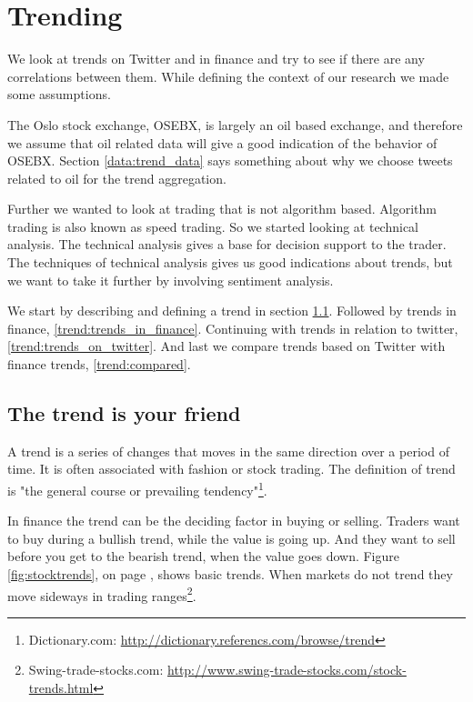 \chapter{Trending}\label{trend}

We look at trends on Twitter and in finance and try to see if there are any
correlations between them. While defining the context of our research we made
some assumptions.

The Oslo stock exchange, OSEBX, is largely an oil based exchange, and
therefore we assume that oil related data will give a good indication of the
behavior of OSEBX. Section \ref{data:trend_data} says something about why we
choose tweets related to oil for the trend aggregation.

Further we wanted to look at trading that is not algorithm based. Algorithm
trading is also known as speed trading. So we started looking at technical
analysis. The technical analysis gives a base for decision support to the
trader. The techniques of technical analysis gives us good indications about
trends, but we want to take it further by involving sentiment analysis. 

We start by describing and defining a trend in section
\ref{trend:trend_is_your_friend}. 
Followed by trends in finance, \ref{trend:trends_in_finance}. 
Continuing with trends in relation to twitter, \ref{trend:trends_on_twitter}. 
And last we compare trends based on Twitter with finance trends, \ref{trend:compared}.
%

\section{The trend is your friend}\label{trend:trend_is_your_friend}
A trend is a series of changes that moves in the same direction over a period
of time. It is often associated with fashion or stock trading. The
definition of trend is "the general course or prevailing
tendency"\footnote{Dictionary.com:
\url{http://dictionary.referencs.com/browse/trend}}.

In finance the trend can be the deciding factor in buying or selling. Traders want
to buy during a bullish trend, while the value is going up. And they 
want to sell before you get to the bearish trend, when the value goes down.
Figure \ref{fig:stocktrends}, on page \pageref{fig:stocktrends}, shows basic
trends. When markets do not trend they move
sideways in trading ranges\footnote{Swing-trade-stocks.com:
\url{http://www.swing-trade-stocks.com/stock-trends.html}}.   

